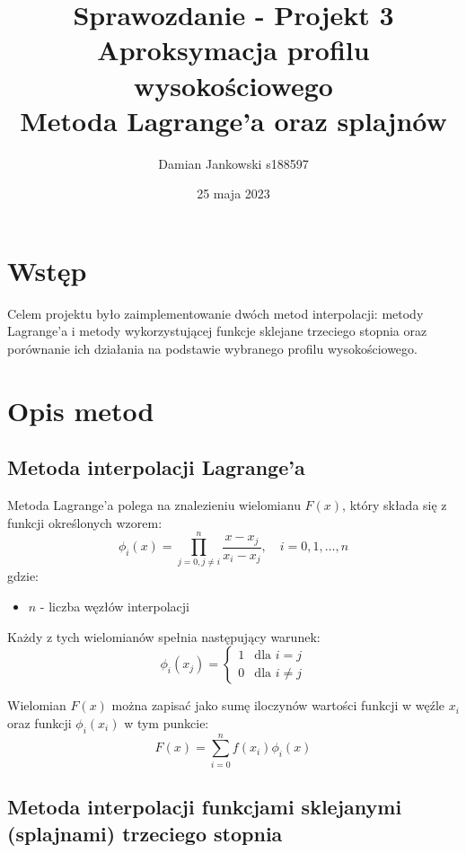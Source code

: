 \documentclass{article}
\title{Sprawozdanie - Projekt 3 \\ Aproksymacja profilu wysokościowego \\
Metoda Lagrange'a oraz splajnów}
\author{Damian Jankowski s188597}
\date{25 maja 2023}
\begin{document}
\maketitle

\tableofcontents

\section{Wstęp}

Celem projektu było zaimplementowanie dwóch metod interpolacji: 
metody Lagrange'a i metody wykorzystującej funkcje sklejane trzeciego stopnia
oraz porównanie ich działania na podstawie wybranego profilu wysokościowego.

\section{Opis metod}

\subsection{Metoda interpolacji Lagrange'a}

Metoda Lagrange'a polega na znalezieniu wielomianu $F(x)$, który składa się z funkcji określonych wzorem:
\begin{equation}
   \phi_i(x) = \prod_{j=0, j \neq i}^{n} \frac{x - x_j}{x_i - x_j}, \quad i = 0, 1, \dots, n
\end{equation}
gdzie:
\begin{itemize}
    \item $n$ - liczba węzłów interpolacji
\end{itemize}

Każdy z tych wielomianów spełnia następujący warunek:
\begin{equation}
    \phi_i(x_j) = \begin{cases}
        1 & \text{dla } i = j \\
        0 & \text{dla } i \neq j
    \end{cases}
\end{equation}

Wielomian $F(x)$ można zapisać jako sumę iloczynów wartości funkcji w węźle $x_i$ oraz
funkcji $\phi_i(x_i)$ w tym punkcie:
\begin{equation}
    F(x) = \sum_{i=0}^{n} f(x_i) \phi_i(x)
\end{equation}

\subsection{Metoda interpolacji funkcjami sklejanymi (splajnami) trzeciego stopnia}
\end{document}
